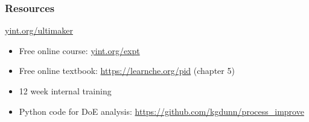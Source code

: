 \documentclass[handout,11pt,aspectratio=169,mathserif]{beamer}
\begin{document}
\begin{frame}\frametitle{Resources}
	
	\begin{exampleblock}{}
		\centerline{\LARGE  \href{http://yint.org/ultimaker}{yint.org/ultimaker}}
	\end{exampleblock}
	
	\begin{itemize}
		\item	Free online course: \href{http://yint.org/expt}{yint.org/expt}
		\item	Free online textbook: \href{https://learnche.org/pid/design-analysis-experiments/index}{https://learnche.org/pid} (chapter 5)
		\item	12 week internal training
		\item	Python code for DoE analysis: \href{https://github.com/kgdunn/process\_improve}{https://github.com/kgdunn/process\_improve}
	\end{itemize}
\end{frame}

\iffalse
\begin{itemize}
	\item   Collapsability sequence
	\item 	Interaction: what is?
	\item 	Tradeoff: 4 factors and 5 expts. But with 8 expts you can docs lot more
	  - tradeoff: uncertainty from materials, people, or equipment.
	  \item   blocking: in the tradeoff table
	\item 	Randomization is important
	\item 	Interaction plots
	\item 	Contour plot concept
	\item 	Disturbance and covariates	
	\item 	Slide 283 for fraction factorial
	\item 	Rsm example walk through, incl slide 521. All models useful
	\item 	Cost approach incl slide 491
	\item 	When things go wrong you have fallback if you had those extra experiments
\end{itemize}
\fi
\end{document}
